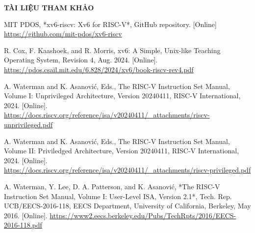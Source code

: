 \newpage
\thispagestyle{empty}

\begin{center}
    {\Large\bfseries\color{central_blue} TÀI LIỆU THAM KHẢO}
\end{center}


\begin{enumerate}[label={[{\arabic*}]}]
    \item MIT PDOS, *xv6-riscv: Xv6 for RISC-V*, GitHub repository. [Online] \url{https://github.com/mit-pdos/xv6-riscv}
    \item R. Cox, F. Kaashoek, and R. Morris, xv6: A Simple, Unix-like Teaching Operating System, Revision 4, Aug. 2024. [Online]. \url{https://pdos.csail.mit.edu/6.828/2024/xv6/book-riscv-rev4.pdf}
    \item A. Waterman and K. Asanović, Eds., The RISC-V Instruction Set Manual, Volume I: Unprivileged Architecture, Version 20240411, RISC-V International, 2024. [Online]. \url{https://docs.riscv.org/reference/isa/v20240411/_attachments/riscv-unprivileged.pdf}
    \item A. Waterman and K. Asanović, Eds., The RISC-V Instruction Set Manual, Volume II: Priviledged Architecture, Version 20240411, RISC-V International, 2024. [Online]. \url{https://docs.riscv.org/reference/isa/v20240411/_attachments/riscv-privileged.pdf}
    \item A. Waterman, Y. Lee, D. A. Patterson, and K. Asanović, *The RISC-V Instruction Set Manual, Volume I: User-Level ISA, Version 2.1*, Tech. Rep. UCB/EECS-2016-118, EECS Department, University of California, Berkeley, May 2016. [Online]. \url{https://www2.eecs.berkeley.edu/Pubs/TechRpts/2016/EECS-2016-118.pdf}
\end{enumerate}

